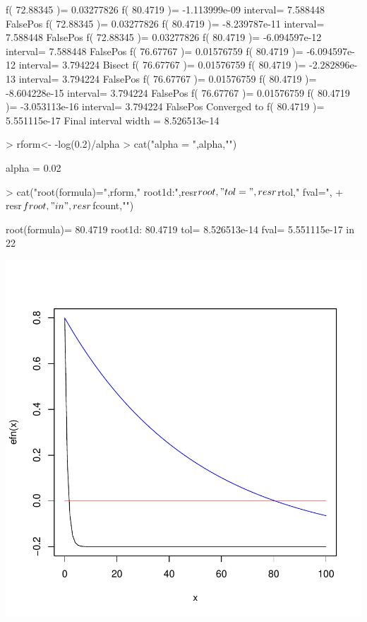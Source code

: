 \documentclass[11pt,letterpaper]{article}
\begin{document}
\begin{Schunk}
\begin{Soutput}
f( 72.88345 )= 0.03277826   f( 80.4719 )= -1.113999e-09   interval= 7.588448    FalsePos 
f( 72.88345 )= 0.03277826   f( 80.4719 )= -8.239787e-11   interval= 7.588448    FalsePos 
f( 72.88345 )= 0.03277826   f( 80.4719 )= -6.094597e-12   interval= 7.588448    FalsePos 
f( 76.67767 )= 0.01576759   f( 80.4719 )= -6.094597e-12   interval= 3.794224    Bisect 
f( 76.67767 )= 0.01576759   f( 80.4719 )= -2.282896e-13   interval= 3.794224    FalsePos 
f( 76.67767 )= 0.01576759   f( 80.4719 )= -8.604228e-15   interval= 3.794224    FalsePos 
f( 76.67767 )= 0.01576759   f( 80.4719 )= -3.053113e-16   interval= 3.794224    FalsePos 
Converged to f( 80.4719 )= 5.551115e-17 
  Final interval width = 8.526513e-14 
\end{Soutput}
\begin{Sinput}
> rform<- -log(0.2)/alpha
> cat("alpha = ",alpha,"\n")
\end{Sinput}
\begin{Soutput}
alpha =  0.02 
\end{Soutput}
\begin{Sinput}
> cat("root(formula)=",rform,"  root1d:",resr$root," tol=",resr$rtol,"  fval=",
+          resr$froot,"  in   ",resr$fcount,"\n\n") 
\end{Sinput}
\begin{Soutput}
root(formula)= 80.4719   root1d: 80.4719  tol= 8.526513e-14   fval= 5.551115e-17   in    22 
\end{Soutput}
\end{Schunk}
\includegraphics{roots-vig-chunk13}
\end{document}
